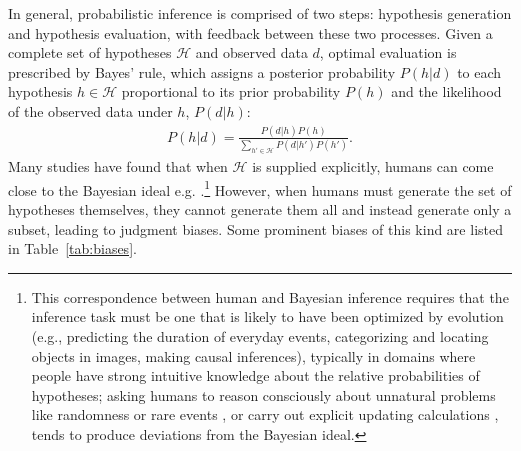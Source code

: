 In general, probabilistic inference is comprised of two steps: hypothesis generation and hypothesis evaluation, with feedback between these two processes. Given a complete set of hypotheses $\mathcal{H}$ and observed data $d$, optimal evaluation is prescribed by Bayes' rule, which assigns a posterior probability $P(h|d)$ to each hypothesis $h \in \mathcal{H}$ proportional to its prior probability $P(h)$ and the likelihood of the observed data under $h$, $P(d|h)$:
\begin{align}
P(h|d) = \frac{P(d|h) P(h)}{\sum_{h' \in \mathcal{H}} P(d|h') P(h')}.
\end{align}
Many studies have found that when $\mathcal{H}$ is supplied explicitly, humans can come close to the Bayesian ideal e.g. \citet{griffiths2006,griffiths2011,frank2012,petzschner2015,oaksford2007}.\footnote{This correspondence between human and Bayesian inference requires that the inference task must be one that is likely to have been optimized by evolution (e.g., predicting the duration of everyday events, categorizing and locating objects in images, making causal inferences), typically in domains where people have strong intuitive knowledge about the relative probabilities of hypotheses; asking humans to reason consciously about unnatural problems like randomness or rare events \citep[see][for discussion]{chater2006}, or carry out explicit updating calculations \citep{peterson1967man}, tends to produce deviations from the Bayesian ideal.} However, when humans must generate the set of hypotheses themselves, they cannot generate them all and instead generate only a subset, leading to judgment biases. \citep{Thomas2008,Dougherty2003,carroll2015,koriat1980,weber1993,Gettys1979} Some prominent biases of this kind are listed in Table~\ref{tab:biases}.
